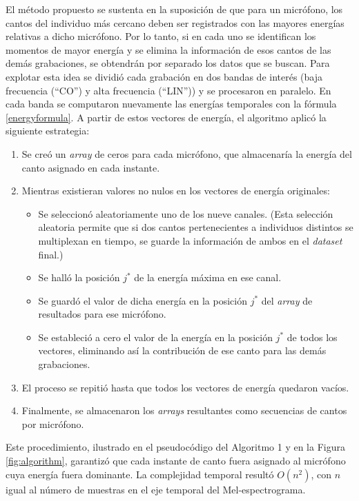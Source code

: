 El método propuesto se sustenta en la suposición de que
para un micrófono, los cantos del individuo más cercano deben ser registrados con las
mayores energías relativas a dicho micrófono. Por lo tanto, si en cada uno se identifican 
los momentos de mayor energía y se elimina la información de esos cantos de las demás grabaciones,
se obtendrán por separado los datos que se buscan.
Para explotar esta idea se dividió cada 
grabación en dos bandas de interés (baja frecuencia (“CO”) y 
alta frecuencia (“LIN”)) y se procesaron en paralelo. En cada 
banda se computaron nuevamente las energías temporales con la 
fórmula \eqref{energyformula}. 
A partir de estos vectores de energía, el algoritmo aplicó la 
siguiente estrategia:

\begin{enumerate}
  \item Se creó un \emph{array} de ceros para cada micrófono, que almacenaría la energía del canto asignado en cada instante.
  \item Mientras existieran valores no nulos en los vectores de energía originales:
  \begin{itemize}
    \item Se seleccionó aleatoriamente uno de los nueve canales. (Esta selección aleatoria permite que si dos cantos pertenecientes a individuos distintos se multiplexan en tiempo, se guarde la información de ambos en el \emph{dataset} final.)
    \item Se halló la posición \(j^*\) de la energía máxima en ese canal.
    \item Se guardó el valor de dicha energía en la posición \(j^*\) del \emph{array} de resultados para ese micrófono.
    \item Se estableció a cero el valor de la energía en la posición \(j^*\) de todos los vectores, eliminando así la contribución de ese canto para las demás grabaciones.
  \end{itemize}
  \item El proceso se repitió hasta que todos los vectores de energía quedaron vacíos.
  \item Finalmente, se almacenaron los \emph{arrays} resultantes como secuencias de cantos por micrófono.
\end{enumerate}

Este procedimiento, ilustrado en el pseudocódigo del 
Algoritmo 1 y en la Figura \ref{fig:algorithm}, garantizó que cada instante de canto fuera 
asignado al micrófono cuya energía fuera dominante. 
La complejidad temporal resultó \(O(n^2)\), con \(n\) igual al 
número de muestras en el eje temporal del Mel-espectrograma.

